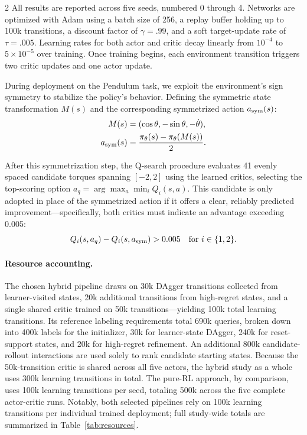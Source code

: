 \begin{multicols}{2}
All results are reported across five seeds, numbered 0 through 4.
Networks are optimized with Adam using a batch size of 256, a replay
buffer holding up to 100k transitions, a discount factor of
$\gamma=.99$, and a soft target-update rate of $\tau=.005$. Learning
rates for both actor and critic decay linearly from $10^{-4}$ to
$5{\times}10^{-5}$ over training. Once training begins, each
environment transition triggers two critic updates and one actor
update.

During deployment on the Pendulum task, we exploit the environment's
sign symmetry to stabilize the policy's behavior. Defining the
symmetric state transformation $M(s)$ and the corresponding
symmetrized action $a_{\rm sym}(s)$:
$$\begin{aligned}
M(s)&=(\cos\theta,-\sin\theta,-\dot\theta),\\
a_{\rm sym}(s)&=\frac{\pi_\theta(s)-\pi_\theta(M(s))}{2}.
\end{aligned}$$

After this symmetrization step, the Q-search procedure evaluates 41
evenly spaced candidate torques spanning $[-2,2]$ using the learned
critics, selecting the top-scoring option
$a_q=\arg\max_a\min_iQ_i(s,a)$. This candidate is only adopted in
place of the symmetrized action if it offers a clear, reliably
predicted improvement—specifically, both critics must indicate an
advantage exceeding 0.005:
$$Q_i(s,a_q)-Q_i(s,a_{\rm sym})>0.005
\quad\text{for }i\in\{1,2\}.$$

\paragraph{Resource accounting.}
The chosen hybrid pipeline draws on 30k DAgger transitions collected
from learner-visited states, 20k additional transitions from
high-regret states, and a single shared critic trained on 50k
transitions—yielding 100k total learning transitions. Its reference
labeling requirements total 690k queries, broken down into 400k labels
for the initializer, 30k for learner-state DAgger, 240k for
reset-support states, and 20k for high-regret refinement. An
additional 800k candidate-rollout interactions are used solely to rank
candidate starting states. Because the 50k-transition critic is shared
across all five actors, the hybrid study as a whole uses 300k learning
transitions in total. The pure-RL approach, by comparison, uses 100k
learning transitions per seed, totaling 500k across the five complete
actor-critic runs. Notably, both selected pipelines rely on 100k
learning transitions per individual trained deployment; full
study-wide totals are summarized in Table~\ref{tab:resources}.


\end{multicols}
